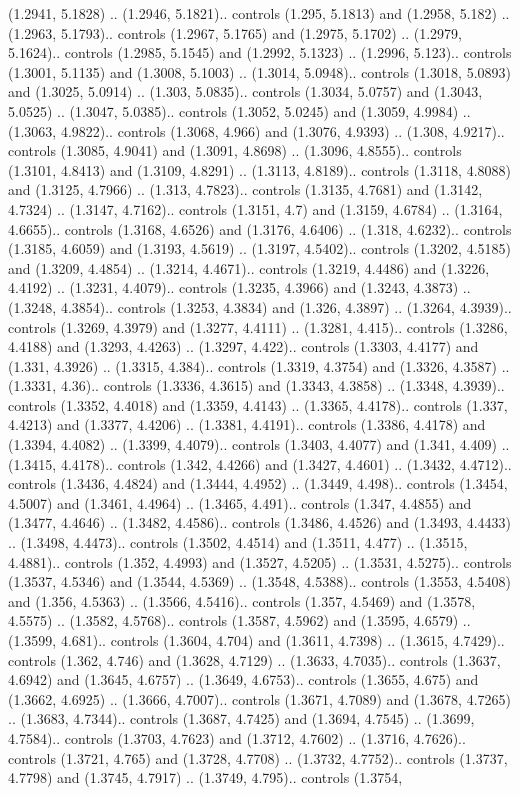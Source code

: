 (1.2941, 5.1828) .. (1.2946, 5.1821).. controls (1.295, 5.1813) and (1.2958, 5.182) .. (1.2963, 5.1793).. controls (1.2967, 5.1765) and (1.2975, 5.1702) .. (1.2979, 5.1624).. controls (1.2985, 5.1545) and (1.2992, 5.1323) .. (1.2996, 5.123).. controls (1.3001, 5.1135) and (1.3008, 5.1003) .. (1.3014, 5.0948).. controls (1.3018, 5.0893) and (1.3025, 5.0914) .. (1.303, 5.0835).. controls (1.3034, 5.0757) and (1.3043, 5.0525) .. (1.3047, 5.0385).. controls (1.3052, 5.0245) and (1.3059, 4.9984) .. (1.3063, 4.9822).. controls (1.3068, 4.966) and (1.3076, 4.9393) .. (1.308, 4.9217).. controls (1.3085, 4.9041) and (1.3091, 4.8698) .. (1.3096, 4.8555).. controls (1.3101, 4.8413) and (1.3109, 4.8291) .. (1.3113, 4.8189).. controls (1.3118, 4.8088) and (1.3125, 4.7966) .. (1.313, 4.7823).. controls (1.3135, 4.7681) and (1.3142, 4.7324) .. (1.3147, 4.7162).. controls (1.3151, 4.7) and (1.3159, 4.6784) .. (1.3164, 4.6655).. controls (1.3168, 4.6526) and (1.3176, 4.6406) .. (1.318, 4.6232).. controls (1.3185, 4.6059) and (1.3193, 4.5619) .. (1.3197, 4.5402).. controls (1.3202, 4.5185) and (1.3209, 4.4854) .. (1.3214, 4.4671).. controls (1.3219, 4.4486) and (1.3226, 4.4192) .. (1.3231, 4.4079).. controls (1.3235, 4.3966) and (1.3243, 4.3873) .. (1.3248, 4.3854).. controls (1.3253, 4.3834) and (1.326, 4.3897) .. (1.3264, 4.3939).. controls (1.3269, 4.3979) and (1.3277, 4.4111) .. (1.3281, 4.415).. controls (1.3286, 4.4188) and (1.3293, 4.4263) .. (1.3297, 4.422).. controls (1.3303, 4.4177) and (1.331, 4.3926) .. (1.3315, 4.384).. controls (1.3319, 4.3754) and (1.3326, 4.3587) .. (1.3331, 4.36).. controls (1.3336, 4.3615) and (1.3343, 4.3858) .. (1.3348, 4.3939).. controls (1.3352, 4.4018) and (1.3359, 4.4143) .. (1.3365, 4.4178).. controls (1.337, 4.4213) and (1.3377, 4.4206) .. (1.3381, 4.4191).. controls (1.3386, 4.4178) and (1.3394, 4.4082) .. (1.3399, 4.4079).. controls (1.3403, 4.4077) and (1.341, 4.409) .. (1.3415, 4.4178).. controls (1.342, 4.4266) and (1.3427, 4.4601) .. (1.3432, 4.4712).. controls (1.3436, 4.4824) and (1.3444, 4.4952) .. (1.3449, 4.498).. controls (1.3454, 4.5007) and (1.3461, 4.4964) .. (1.3465, 4.491).. controls (1.347, 4.4855) and (1.3477, 4.4646) .. (1.3482, 4.4586).. controls (1.3486, 4.4526) and (1.3493, 4.4433) .. (1.3498, 4.4473).. controls (1.3502, 4.4514) and (1.3511, 4.477) .. (1.3515, 4.4881).. controls (1.352, 4.4993) and (1.3527, 4.5205) .. (1.3531, 4.5275).. controls (1.3537, 4.5346) and (1.3544, 4.5369) .. (1.3548, 4.5388).. controls (1.3553, 4.5408) and (1.356, 4.5363) .. (1.3566, 4.5416).. controls (1.357, 4.5469) and (1.3578, 4.5575) .. (1.3582, 4.5768).. controls (1.3587, 4.5962) and (1.3595, 4.6579) .. (1.3599, 4.681).. controls (1.3604, 4.704) and (1.3611, 4.7398) .. (1.3615, 4.7429).. controls (1.362, 4.746) and (1.3628, 4.7129) .. (1.3633, 4.7035).. controls (1.3637, 4.6942) and (1.3645, 4.6757) .. (1.3649, 4.6753).. controls (1.3655, 4.675) and (1.3662, 4.6925) .. (1.3666, 4.7007).. controls (1.3671, 4.7089) and (1.3678, 4.7265) .. (1.3683, 4.7344).. controls (1.3687, 4.7425) and (1.3694, 4.7545) .. (1.3699, 4.7584).. controls (1.3703, 4.7623) and (1.3712, 4.7602) .. (1.3716, 4.7626).. controls (1.3721, 4.765) and (1.3728, 4.7708) .. (1.3732, 4.7752).. controls (1.3737, 4.7798) and (1.3745, 4.7917) .. (1.3749, 4.795).. controls (1.3754, 